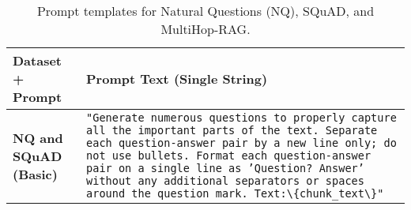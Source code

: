 \begin{table*}[t]
\centering
\caption{Prompt templates for 
Natural Questions (NQ), SQuAD, and
MultiHop-RAG.}
\label{tab:all-prompts}
\renewcommand{\arraystretch}{1.1}
\begin{tabular}{p{3.2cm} p{13.0cm}}
\toprule
\textbf{Dataset + Prompt} & \textbf{Prompt Text (Single String)} \\
\midrule

\textbf{NQ and SQuAD (Basic)}
&
\footnotesize
\texttt{"Generate numerous questions to properly capture all the important parts of the text. Separate each question-answer pair by a new line only; do not use bullets. Format each question-answer pair on a single line as 'Question? Answer' without any additional separators or spaces around the question mark. Text:\textbackslash\{chunk\_text\textbackslash\}"} \\[1em]


\end{tabular}
\end{table*}

